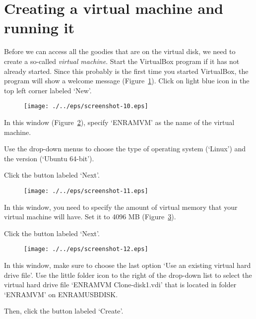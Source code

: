 \section{Creating a virtual machine and running it}

Before we can access all the goodies that are on the virtual disk, we need to create a so-called \textit{virtual machine}. Start the VirtualBox program if it has not already started. Since this probably is the first time you started VirtualBox, the program will show a welcome message (Figure~\ref{fig:screenshot-10}). Click on light blue icon in the top left corner labeled `New'.

\begin{figure}[ht]
  \centering
    \texttt{[image: ./../eps/screenshot-10.eps]}
  \caption{}
  \label{fig:screenshot-10}
\end{figure}


In this window (Figure~\ref{fig:screenshot-11}), specify `ENRAMVM' as the name of the virtual machine.

Use the drop-down menus to choose the type of operating system (`Linux') and the version (`Ubuntu 64-bit').

Click the button labeled `Next'.


\begin{figure}[ht]
  \centering
    \texttt{[image: ./../eps/screenshot-11.eps]}
  \caption{}
  \label{fig:screenshot-11}
\end{figure}
\clearpage

In this window, you need to specify the amount of virtual memory that your virtual machine will have. Set it to 4096 MB (Figure~\ref{fig:screenshot-12}).

Click the button labeled `Next'.

\begin{figure}[ht]
  \centering
    \texttt{[image: ./../eps/screenshot-12.eps]}
  \caption{}
  \label{fig:screenshot-12}
\end{figure}


In this window, make sure to choose the last option `Use an existing virtual hard drive file'. Use the little folder icon to the right of the drop-down list to select the virtual hard drive file `ENRAMVM Clone-disk1.vdi' that is located in folder `ENRAMVM' on ENRAMUSBDISK.

Then, click the button labeled `Create'.

